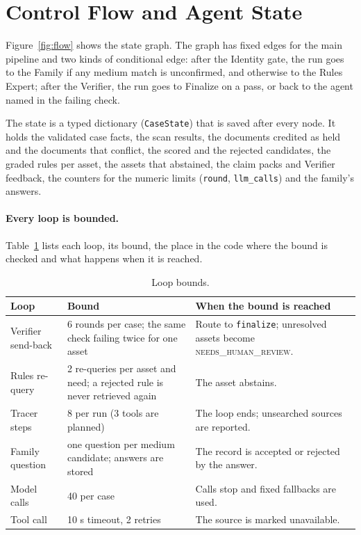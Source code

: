 \section{Control Flow and Agent State}
Figure~\ref{fig:flow} shows the state graph. The graph has fixed edges for the main pipeline and two kinds of conditional edge: after the Identity gate, the run goes to the Family if any medium match is unconfirmed, and otherwise to the Rules Expert; after the Verifier, the run goes to Finalize on a pass, or back to the agent named in the failing check.



The state is a typed dictionary (\texttt{CaseState}) that is saved after every node. It holds the validated case facts, the scan results, the documents credited as held and the documents that conflict, the scored and the rejected candidates, the graded rules per asset, the assets that abstained, the claim packs and Verifier feedback, the counters for the numeric limits (\texttt{round}, \texttt{llm\_calls}) and the family's answers.

\paragraph{Every loop is bounded.} Table~\ref{tab:loops} lists each loop, its bound, the place in the code where the bound is checked and what happens when it is reached.

\begin{table}[H]
\centering\footnotesize{}
\caption{Loop bounds.}\label{tab:loops}
\renewcommand{\arraystretch}{1.1}
\begin{tabularx}{\linewidth}{@{}p{3.2cm}p{2.8cm}X@{}}
\toprule
\textbf{Loop} & \textbf{Bound} & \textbf{When the bound is reached} \\ \midrule
Verifier send-back & 6 rounds per case; the same check failing twice for one asset & Route to \texttt{finalize}; unresolved assets become \textsc{needs\_human\_review}. \\
Rules re-query & 2 re-queries per asset and need; a rejected rule is never retrieved again & The asset abstains. \\
Tracer steps & 8 per run (3 tools are planned) & The loop ends; unsearched sources are reported. \\
Family question & one question per medium candidate; answers are stored & The record is accepted or rejected by the answer. \\
Model calls & 40 per case & Calls stop and fixed fallbacks are used. \\
Tool call & 10 s timeout, 2 retries & The source is marked unavailable. \\ \bottomrule
\end{tabularx}
\end{table}

